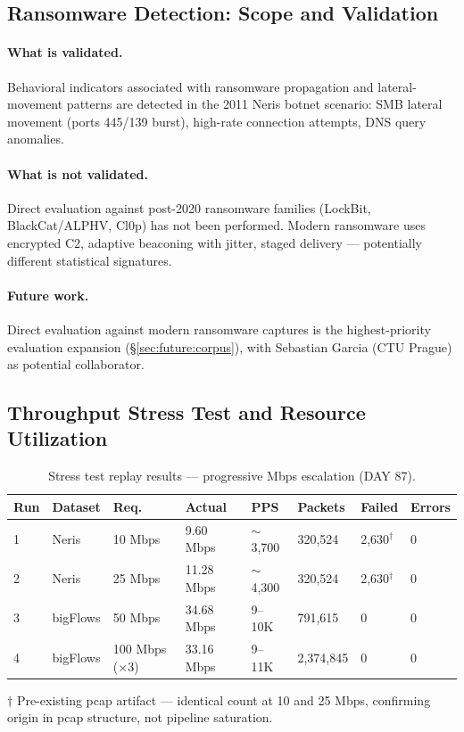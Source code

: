 \documentclass[11pt,a4paper]{article}
\begin{document}
\subsection{Ransomware Detection: Scope and Validation}

\paragraph{What is validated.}
Behavioral indicators associated with ransomware propagation and lateral-movement patterns
are detected in the 2011 Neris botnet scenario: SMB lateral movement (ports 445/139 burst),
high-rate connection attempts, DNS query anomalies.

\paragraph{What is not validated.}
Direct evaluation against post-2020 ransomware families (LockBit, BlackCat/ALPHV, Cl0p) has
not been performed. Modern ransomware uses encrypted C2, adaptive beaconing with jitter,
staged delivery --- potentially different statistical signatures.

\paragraph{Future work.}
Direct evaluation against modern ransomware captures is the highest-priority evaluation
expansion (\S\ref{sec:future:corpus}), with Sebastian Garcia (CTU Prague) as potential
collaborator.

\subsection{Throughput Stress Test and Resource Utilization}

\begin{table}[h]
\centering
\caption{Stress test replay results --- progressive Mbps escalation (DAY 87).}
\label{tab:stress}
\begin{tabular}{llllllll}
\toprule
\textbf{Run} & \textbf{Dataset} & \textbf{Req.} & \textbf{Actual} & \textbf{PPS} & \textbf{Packets} & \textbf{Failed} & \textbf{Errors} \\
\midrule
1 & Neris    & 10 Mbps  & 9.60 Mbps  & ${\sim}$3,700   & 320,524   & 2,630$^{\dagger}$ & 0 \\
2 & Neris    & 25 Mbps  & 11.28 Mbps & ${\sim}$4,300   & 320,524   & 2,630$^{\dagger}$ & 0 \\
3 & bigFlows & 50 Mbps  & 34.68 Mbps & 9--10K          & 791,615   & 0                 & 0 \\
4 & bigFlows & 100 Mbps ($\times$3) & 33.16 Mbps & 9--11K & 2,374,845 & 0           & 0 \\
\bottomrule
\end{tabular}
\medskip
\footnotesize{$\dagger$ Pre-existing pcap artifact --- identical count at 10 and 25 Mbps,
confirming origin in pcap structure, not pipeline saturation.}
\end{table}
\end{document}
